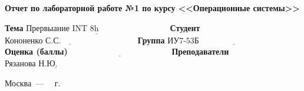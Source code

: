 \begin{titlepage}
	
	\begin{center}
		\Large\textbf{Отчет по лабораторной работе №1 по курсу <<Операционные системы>>}\newline
	\end{center}
	
	\noindent\textbf{Тема} $\underline{\text{Прервыание INT 8h~~~~~~~~~~~~~~~~~~~~~~~~~}}$\newline\newline\newline
	\noindent\textbf{Студент} $\underline{\text{Кононенко С.С.~~~~~~~~~~~~~~~~~~~~~~~~~~~}}$\newline\newline
	\noindent\textbf{Группа} $\underline{\text{ИУ7-53Б~~~~~~~~~~~~~~~~~~~~~~~~~~~~~~~~~~~~~}}$\newline\newline
	\noindent\textbf{Оценка (баллы)} $\underline{\text{~~~~~~~~~~~~~~~~~~~~~~~~~~~~~~~~~~~~}}$\newline\newline
	\noindent\textbf{Преподаватели} $\underline{\text{Рязанова Н.Ю.~~~~~~~~~~~~~~~~~~}}$\newline
	
	\begin{center}
		\vfill
		Москва~---~\the\year
		~г.
	\end{center}
 \restoregeometry
\end{titlepage}
